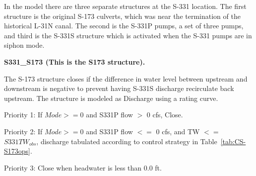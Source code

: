 In the model there are three separate structures at the S-331 location.
The first structure is the original S-173 culverts, which was near the termination of the historical L-31N canal.
The second is the S-331P pumps, a set of three pumps, and third is the S-331S structure which is activated when the S-331 pumps are in siphon mode.



\textbf{S331\_S173 (This is the S173 structure).}

The S-173 structure closes if the difference in water level between upstream and downstream is negative to prevent having S-331S discharge recirculate back upstream. The structure is modeled as Discharge using a rating curve.


\begin{packed_items}
\item Priority 1: If $Mode>=0$ and  S331P flow $>$ 0 cfs, Close. %
\item Priority 2: If $Mode>=0$ and  S331P flow $<=$ 0 cfs, and TW $<=$ $S331TW_{obs}$, discharge tabulated according to control strategy in Table~\ref{tab:CS-S173ops}.
\item Priority 3: Close when headwater is less than 0.0 ft.
\end{packed_items}

